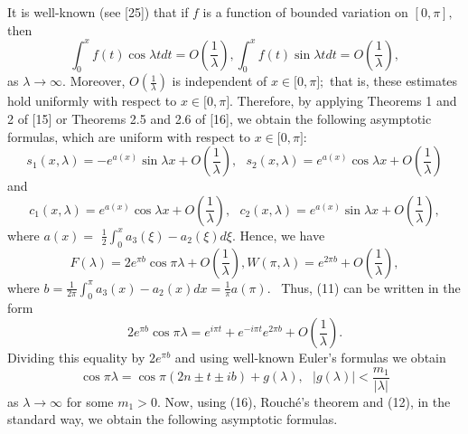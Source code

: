 \documentclass{article}%
\begin{document}
It is well-known (see [25]) that if $f$ is a function of bounded variation on
$[0,\pi],$ then
\begin{equation}
\int_{0}^{x}f(t)\cos\lambda tdt=O\left(  \frac{1}{\lambda}\right)  ,\text{
}\int_{0}^{x}f(t)\sin\lambda tdt=O\left(  \frac{1}{\lambda}\right)  , \tag{13}%
\end{equation}
as $\lambda\rightarrow\infty$. Moreover, $O\left(  \frac{1}{\lambda}\right)  $
is independent of $x\in\lbrack0,\pi];$ that is, these estimates hold uniformly
with respect to $x\in\lbrack0,\pi].$ Therefore, by applying Theorems 1 and 2
of [15] or Theorems 2.5 and 2.6 of [16], we obtain the following asymptotic
formulas, which are uniform with respect to $x\in\lbrack0,\pi]$:
\begin{equation}
s_{1}(x,\lambda)=-e^{a(x)}\sin\lambda x+O\left(  \frac{1}{\lambda}\right)
,\text{ }s_{2}(x,\lambda)=e^{a(x)}\cos\lambda x+O\left(  \frac{1}{\lambda
}\right)  \tag{14}%
\end{equation}
and
\begin{equation}
c_{1}(x,\lambda)=e^{a(x)}\cos\lambda x+O\left(  \frac{1}{\lambda}\right)
,\text{ }c_{2}(x,\lambda)=e^{a(x)}\sin\lambda x+O\left(  \frac{1}{\lambda
}\right)  , \tag{15}%
\end{equation}
where $a(x)=$ $\frac{1}{2}%
{\textstyle\int\nolimits_{0}^{x}}
a_{3}(\xi)-a_{2}(\xi)d\xi.$ Hence, we have
\[
F(\lambda)=2e^{\pi b}\cos\pi\lambda+O\left(  \frac{1}{\lambda}\right)  ,\text{
}W(\pi,\lambda)=e^{2\pi b}+O\left(  \frac{1}{\lambda}\right)  ,
\]
where $b=\frac{1}{2\pi}%
{\textstyle\int\nolimits_{0}^{\pi}}
a_{3}(x)-a_{2}(x)dx=\frac{1}{\pi}a(\pi)$. \ Thus, (11) can be written in the
form
\[
2e^{\pi b}\cos\pi\lambda=e^{i\pi t}+e^{-i\pi t}e^{2\pi b}+O\left(  \frac
{1}{\lambda}\right)  .
\]
Dividing this equality by $2e^{\pi b}$ and using well-known Euler's formulas
we obtain
\begin{equation}
\cos\pi\lambda=\cos\pi(2n\pm t\pm ib)+g(\lambda),\text{ }\left\vert
g(\lambda)\right\vert <\frac{m_{1}}{\left\vert \lambda\right\vert } \tag{16}%
\end{equation}
as $\lambda\rightarrow\infty$ for some $m_{1}>0.$ Now, using (16),
Rouch\'{e}'s theorem and (12), in the standard way, we obtain the following
asymptotic formulas.
\end{document}
